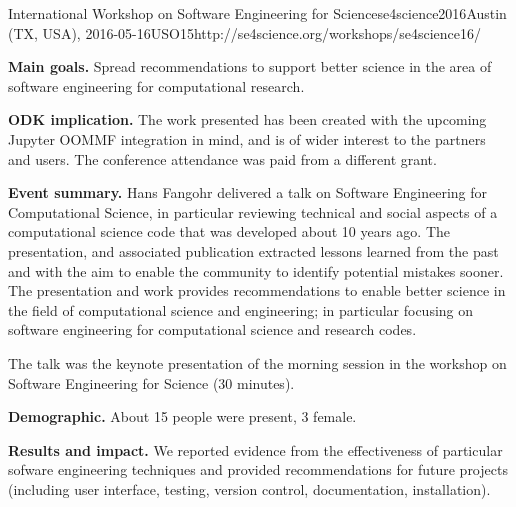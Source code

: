 \begin{event}{International Workshop on Software Engineering for
    Science}{se4science2016}{Austin (TX, USA),
    2016-05-16}{USO}{15}{http://se4science.org/workshops/se4science16/}

  \textbf{Main goals.} Spread recommendations to support better
  science in the area of software engineering for computational research.

  \textbf{ODK implication.} The work presented has been created with
  the upcoming Jupyter OOMMF integration in mind, and is of wider
  interest to the \ODK partners and users. The conference
  attendance was paid from a different grant.

  \textbf{Event summary.} Hans Fangohr delivered a talk on Software
  Engineering for Computational Science, in particular reviewing
  technical and social aspects of a computational science code that
  was developed about 10 years ago. The presentation, and associated
  publication \cite{16FangohrSE4Science} extracted lessons learned from the past and with the aim
  to enable the community to identify potential mistakes sooner. The
  presentation and work provides recommendations to enable better
  science in the field of computational science and engineering; in
  particular focusing on software engineering for computational
  science and research codes.

  The talk was the keynote presentation of the morning session in the
  workshop on Software Engineering for Science (30 minutes).

  \textbf{Demographic.} About 15 people were present, 3 female.

  \textbf{Results and impact.} We reported evidence from the
  effectiveness of particular sofware engineering techniques and
  provided recommendations for future projects (including user
  interface, testing, version control, documentation,
  installation).


\end{event}
